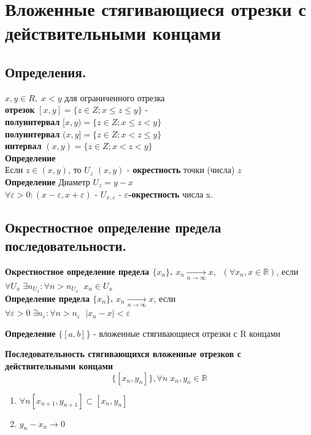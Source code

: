 \documentclass[12pt, paper]{article}
\newcommand{\R}{\mathbb{R}}
\newcommand{\eps}{\varepsilon}
\begin{document}
\section{Вложенные стягивающиеся отрезки с действительными концами}
\subsection{Определения.}
\begin{tcolorbox}
    $x,y \in R,\; x < y$ для ограниченного отрезка\\
    \textbf{отрезок} $[x, y] = \{z \in Z; x \leq z \leq y\}$ - \\
    \textbf{полуинтервал} $[x,y) = \{ z \in Z ; x\leq z < y \}$\\
    \textbf{полуинтервал} $(x,y] = \{ z \in Z ; x < z \leq y \}$\\
    \textbf{интервал} $(x,y) = \{ z \in Z; x < z < y \}$\\
    \textbf{Определение}\\
    Если $z \in (x, y)$, то $U_z$ $(x,y)$ - \textbf{окрестность} точки (числа) $z$\\
    \textbf{Определение}
    Диаметр $U_z = y-x$\\
    $\forall \eps > 0: (x-\eps,x+\eps)$ - $U_{x,\eps}$ - \textbf{$\eps$-окрестность} числа x.
\end{tcolorbox}

\subsection{Окрестностное определение предела последовательности.}
\begin{tcolorbox}
    \textbf{Окрестностное определение предела $\{x_n\}$.}
    $x_n \xrightarrow[n\rightarrow \infty]{} x,\;\; (\forall x_n, x\in\R)$, если\\
    $\forall U_x\; \exists n_{U_x}: \forall n > n_{U_x} \;\; x_n \in U_x $\\
    \textbf{Определение предела $\{x_n\}$.}
    $ x_n\xrightarrow[n\to\infty]{} x$, если\\
    $\forall \eps > 0\; \exists n_\eps: \forall n > n_\eps \;\; |x_n-x| < \eps$
\end{tcolorbox}

\begin{tcolorbox}
    \textbf{Определение}
    $\{[a, b]\}$ - вложенные стягивающиеся отрезки с R концами
\end{tcolorbox}

\begin{tcolorbox}
    \textbf{Последовательность стягивающихся вложенные отрезков с действительными концами}
    \[\{[x_n, y_n]\}, \forall n\;x_n,y_n \in \R\]
    \begin{enumerate}
        \item $\forall n [x_{n+1},y_{n+1}]\subset[x_n,y_n]$
        \item $y_n-x_n \to 0$
    \end{enumerate}  
\end{tcolorbox}
\end{document}
